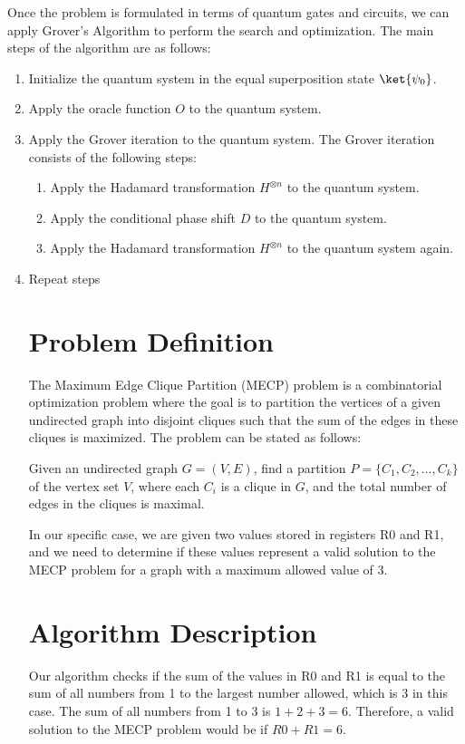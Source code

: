 Once the problem is formulated in terms of quantum gates and circuits, we can apply Grover's Algorithm to perform the search and optimization. The main steps of the algorithm are as follows:

\begin{enumerate}
    \item Initialize the quantum system in the equal superposition state $\ket{\psi_0}$.
    \item Apply the oracle function $O$ to the quantum system.
    \item Apply the Grover iteration to the quantum system. The Grover iteration consists of the following steps:
        \begin{enumerate}
            \item Apply the Hadamard transformation $H^{\otimes n}$ to the quantum system.
            \item Apply the conditional phase shift $D$ to the quantum system.
            \item Apply the Hadamard transformation $H^{\otimes n}$ to the quantum system again.
        \end{enumerate}
    \item Repeat steps

\section{Problem Definition}

The Maximum Edge Clique Partition (MECP) problem is a combinatorial optimization problem where the goal is to partition the vertices of a given undirected graph into disjoint cliques such that the sum of the edges in these cliques is maximized. The problem can be stated as follows:

Given an undirected graph $G = (V, E)$, find a partition $P = \{C_1, C_2, \ldots, C_k\}$ of the vertex set $V$, where each $C_i$ is a clique in $G$, and the total number of edges in the cliques is maximal.

In our specific case, we are given two values stored in registers R0 and R1, and we need to determine if these values represent a valid solution to the MECP problem for a graph with a maximum allowed value of 3.

\section{Algorithm Description}

Our algorithm checks if the sum of the values in R0 and R1 is equal to the sum of all numbers from 1 to the largest number allowed, which is 3 in this case. The sum of all numbers from 1 to 3 is $1 + 2 + 3 = 6$. Therefore, a valid solution to the MECP problem would be if $R0 + R1 = 6$. 


\end{enumerate}
